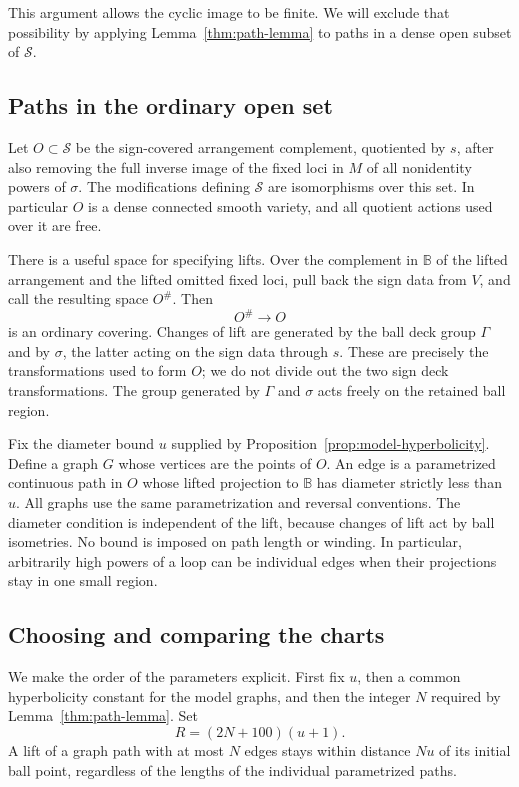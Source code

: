 \documentclass[11pt,reqno]{amsart}
\numberwithin{equation}{section}
\theoremstyle{definition}
\theoremstyle{remark}
\begin{document}
This argument allows the cyclic image to be finite.  We will exclude
that possibility by applying Lemma~\ref{thm:path-lemma} to paths in a
dense open subset of $\mathcal S$.

\subsection{Paths in the ordinary open set}

Let $O\subset\mathcal S$ be the sign-covered arrangement complement,
quotiented by $s$, after also removing the full inverse image of the
fixed loci in $M$ of all nonidentity powers of $\sigma$.  The
modifications defining $\mathcal S$ are isomorphisms over this set.  In
particular $O$ is a dense connected smooth variety, and all quotient
actions used over it are free.

There is a useful space for specifying lifts.  Over the complement in
$\mathbb B$ of the lifted arrangement and the lifted omitted fixed loci,
pull back the sign data from $V$, and call the resulting space
$O^\#$.  Then
\[
 O^\#\longrightarrow O
\]
is an ordinary covering.  Changes of lift are generated by the ball
deck group $\Gamma$ and by $\sigma$, the latter acting on the sign data
through $s$.  These are precisely the transformations used to form
$O$; we do not divide out the two sign deck transformations.  The group generated by $\Gamma$ and $\sigma$ acts freely on the
retained ball region.

Fix the diameter bound $u$ supplied by
Proposition~\ref{prop:model-hyperbolicity}.  Define a graph $G$ whose
vertices are the points of $O$.  An edge is a parametrized continuous
path in $O$ whose lifted projection to $\mathbb B$ has diameter strictly
less than $u$.  All graphs use the same parametrization and reversal
conventions.  The diameter condition is independent of the lift,
because changes of lift act by ball isometries.  No bound is imposed
on path length or winding.  In particular, arbitrarily high powers of
a loop can be individual edges when their projections stay in one
small region.

\subsection{Choosing and comparing the charts}

We make the order of the parameters explicit.  First fix $u$, then a
common hyperbolicity constant for the model graphs, and then the
integer $N$ required by Lemma~\ref{thm:path-lemma}.  Set
\begin{equation}\label{app:radius}
 R=(2N+100)(u+1).
\end{equation}
A lift of a graph path with at most $N$ edges stays within distance
$Nu$ of its initial ball point, regardless of the lengths of the
individual parametrized paths.
\end{document}
